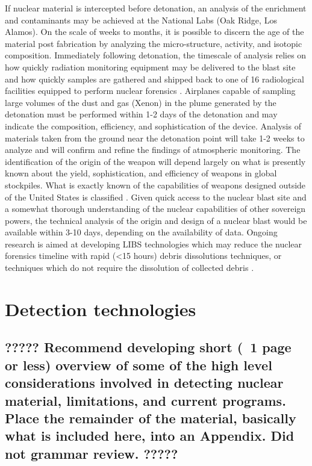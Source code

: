 \documentclass{report}
\begin{document}
If nuclear material is intercepted before detonation, an analysis of the enrichment and contaminants may be achieved at the National Labs (Oak Ridge, Los Alamos). On the scale of weeks to months, it is possible to discern the age of the material post fabrication by analyzing the micro-structure, activity, and isotopic composition. Immediately following detonation, the timescale of analysis relies on how quickly radiation monitoring equipment may be delivered to the blast site and how quickly samples are gathered and shipped back to one of 16 radiological facilities equipped to perform nuclear forensics \cite{1446400}. Airplanes capable of sampling large volumes of the dust and gas (Xenon) in the plume generated by the detonation must be performed within 1-2 days of the detonation and may indicate the composition, efficiency, and sophistication of the device. Analysis of materials taken from the ground near the detonation point will take 1-2 weeks to analyze and will confirm and refine the findings of atmospheric monitoring. The identification of the origin of the weapon will depend largely on what is presently known about the yield, sophistication, and efficiency of weapons in global stockpiles. What is exactly known of the capabilities of weapons designed outside of the United States is classified \cite{Glasstone_1964}. Given quick access to the nuclear blast site and a somewhat thorough understanding of the nuclear capabilities of other sovereign powers, the technical analysis of the origin and design of a nuclear blast would be available within 3-10 days, depending on the availability of data. Ongoing research is aimed at developing LIBS technologies which may reduce the nuclear forensics timeline with rapid (\textless 15 hours) debris dissolutions techniques, or techniques which do not require the dissolution of collected debris \cite{Condron}. 


\section{Detection technologies }

\subsection{????? Recommend developing short (~1 page or less) overview of some of the high level considerations involved in detecting nuclear material, limitations, and current programs.  Place the remainder of the material, basically what is included here, into an Appendix.  Did not grammar review.   ?????}
\end{document}
